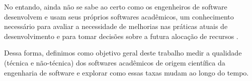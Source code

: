 
No entando, ainda não se sabe ao certo como os engenheiros de software
desenvolvem e usam seus próprios softwares acadêmicos, um conhecimento necessário
para avaliar a necessidade de melhorias nas práticas atuais de desenvolvimento
e para tomar decisões sobre a futura alocação de recursos
\cite{hannay2009scientists}.


Dessa forma, definimos como objetivo geral deste trabalho medir a qualidade
(técnica e não-técnica) dos softwares acadêmicos de origem científica da
engenharia de software e explorar como essas taxas mudam ao longo do tempo.

